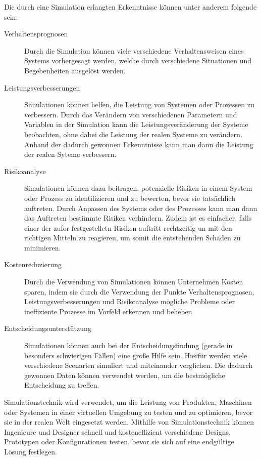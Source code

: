 Die durch eine Simulation erlangten Erkenntnisse können unter anderem folgende sein:
\begin{description}
    \item[Verhaltensprognosen] Durch die Simulation können viele verschiedene Verhaltensweisen eines Systems vorhergesagt werden, welche durch verschiedene Situationen und Begebenheiten ausgelöst werden.
    
    \item[Leistungsverbesserungen] Simulationen können helfen, die Leistung von Systemen oder Prozessen zu verbessern. Durch das Verändern von verschiedenen Parametern und Variablen in der Simulation kann die Leistungsveränderung der Systeme beobachten, ohne dabei die Leistung der realen Systeme zu verändern. Anhand der dadurch gewonnen Erkenntnisse kann man dann die Leistung der realen Syteme verbessern.
    
    \item[Risikoanalyse] Simulationen können dazu beitragen, potenzielle Risiken in einem System oder Prozess zu identifizieren und zu bewerten, bevor sie tatsächlich auftreten. Durch Anpassen des Systems oder des Prozesses kann man dann das Auftreten bestimmte Risiken verhindern. Zudem ist es einfacher, falls einer der zufor festgestelletn Risiken auftritt rechtzeitig un mit den richtigen Mitteln zu reagieren, um somit die entstehenden Schäden zu minimieren.
    
    \item[Kostenreduzierung] Durch die Verwendung von Simulationen können Unternehmen Kosten sparen, indem sie durch die Verwendung der Punkte Verhaltensprognosen, Leistungsverbesserungen und Risikoanalyse mögliche Probleme oder ineffiziente Prozesse im Vorfeld erkennen und beheben.
    
    \item[Entscheidungsunterstützung] Simulationen können auch bei der Entscheidungsfindung (gerade in besonders schwierigen Fällen) eine große Hilfe sein. Hierfür werden viele verschiedene Scenarien simuliert und miteinander verglichen. Die dadurch gewonnen Daten können verwendet werden, um die bestmögliche Entscheidung zu treffen.
\end{description}


Simulationstechnik wird verwendet, um die Leistung von Produkten, Maschinen oder Systemen in einer virtuellen Umgebung zu testen und zu optimieren, bevor sie in der realen Welt eingesetzt werden. Mithilfe von Simulationstechnik können Ingenieure und Designer schnell und kosteneffizient verschiedene Designs, Prototypen oder Konfigurationen testen, bevor sie sich auf eine endgültige Lösung festlegen.

